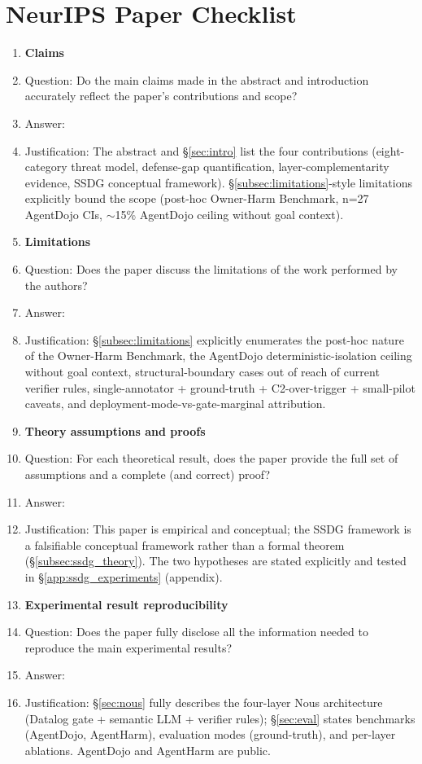 \documentclass{article}
\theoremstyle{definition}
\begin{document}
\section*{NeurIPS Paper Checklist}

\begin{enumerate}

\item {\bf Claims}
  \item[] Question: Do the main claims made in the abstract and introduction accurately reflect the paper's contributions and scope?
  \item[] Answer: \answerYes{}
  \item[] Justification: The abstract and \S\ref{sec:intro} list the four contributions (eight-category threat model, defense-gap quantification, layer-complementarity evidence, SSDG conceptual framework). \S\ref{subsec:limitations}-style limitations explicitly bound the scope (post-hoc Owner-Harm Benchmark, n=27 AgentDojo CIs, $\sim$15\% AgentDojo ceiling without goal context).

\item {\bf Limitations}
  \item[] Question: Does the paper discuss the limitations of the work performed by the authors?
  \item[] Answer: \answerYes{}
  \item[] Justification: \S\ref{subsec:limitations} explicitly enumerates the post-hoc nature of the Owner-Harm Benchmark, the AgentDojo deterministic-isolation ceiling without goal context, structural-boundary cases out of reach of current verifier rules, single-annotator + ground-truth + C2-over-trigger + small-pilot caveats, and deployment-mode-vs-gate-marginal attribution.

\item {\bf Theory assumptions and proofs}
  \item[] Question: For each theoretical result, does the paper provide the full set of assumptions and a complete (and correct) proof?
  \item[] Answer: \answerNA{}
  \item[] Justification: This paper is empirical and conceptual; the SSDG framework is a falsifiable conceptual framework rather than a formal theorem (\S\ref{subsec:ssdg_theory}). The two hypotheses are stated explicitly and tested in \S\ref{app:ssdg_experiments} (appendix).

\item {\bf Experimental result reproducibility}
  \item[] Question: Does the paper fully disclose all the information needed to reproduce the main experimental results?
  \item[] Answer: \answerYes{}
  \item[] Justification: \S\ref{sec:nous} fully describes the four-layer Nous architecture (Datalog gate + semantic LLM + verifier rules); \S\ref{sec:eval} states benchmarks (AgentDojo, AgentHarm), evaluation modes (ground-truth), and per-layer ablations. AgentDojo and AgentHarm are public.


\end{enumerate}
\end{document}
